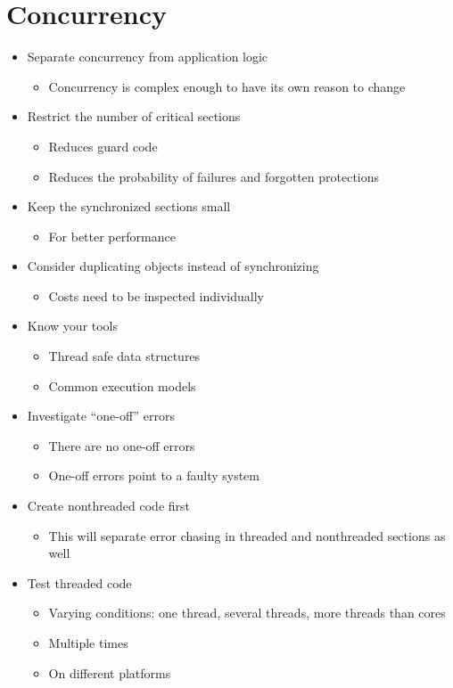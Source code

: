 \section{Concurrency}
\begin{itemize}
    \item Separate concurrency from application logic
    \begin{itemize}
        \item Concurrency is complex enough to have its own reason to change
    \end{itemize}
    \item Restrict the number of critical sections
    \begin{itemize}
        \item Reduces guard code
        \item Reduces the probability of failures and forgotten protections
    \end{itemize}
    \item Keep the synchronized sections small
    \begin{itemize}
        \item For better performance
    \end{itemize}
    \item Consider duplicating objects instead of synchronizing
    \begin{itemize}
        \item Costs need to be inspected individually
    \end{itemize}
    \item Know your tools
    \begin{itemize}
        \item Thread safe data structures
        \item Common execution models
    \end{itemize}
    \item Investigate ``one-off'' errors
    \begin{itemize}
        \item There are no one-off errors
        \item One-off errors point to a faulty system
    \end{itemize}
    \item Create nonthreaded code first
    \begin{itemize}
        \item This will separate error chasing in threaded and nonthreaded sections as well
    \end{itemize}
    \item Test threaded code
    \begin{itemize}
        \item Varying conditions: one thread, several threads, more threads than cores
        \item Multiple times
        \item On different platforms
    \end{itemize}
\end{itemize}

